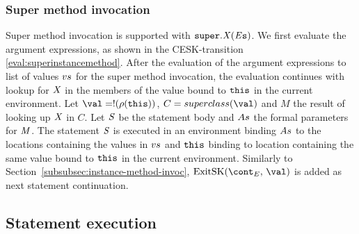 \documentclass{article}
\begin{document}
\subsubsection{Super method invocation}
\label{subsubsec:super-method-invocation}
Super method invocation is supported with $\tt{super}.\mathit{X}(\mathit{E}{s})$.
We first evaluate the argument expressions, as shown in the CESK-transition \eqref{eval:superinstancemethod}.
After the evaluation of the argument expressions to list of values $vs$ for the super method invocation, the evaluation continues with lookup for $\mathit{X}$ in the members of the value bound to $\tt{this}$ in the current environment.
Let $\val = \deref{(\env(\this))}$, $C = \superclass{\val}$ and $M$ the result of looking up $\mathit{X}$ in $C$.
Let $\mathit{S}$ be the statement body and $As$ the formal parameters for $\mathit{M}$.
The statement $\mathit{S}$ is executed in an environment binding $As$ to the locations containing the values in $vs$ and $\tt{this}$ binding to location containing the same value bound to $\tt{this}$ in the current environment.
Similarly to Section~\ref{subsubsec:instance-method-invoc}, $\ExitSK{\val}$ is added as next statement continuation.


\subsection{Statement execution}
\label{subsec:stmt-exectution}
\end{document}
